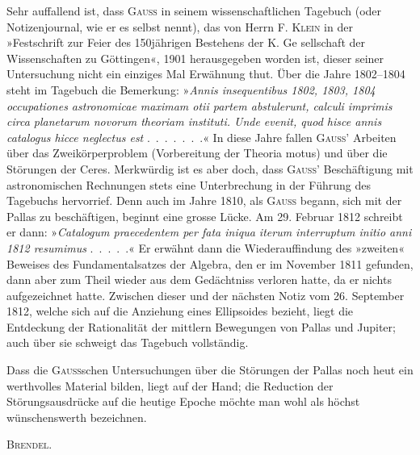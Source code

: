 \par\noindent\hspace*{\parindent}Sehr auffallend ist, dass \textsc{Gauss} in seinem wissenschaftlichen
Tagebuch (oder Notizenjournal, wie er es selbst nennt), das von Herrn
F. \textsc{Klein} in der »Festschrift zur Feier des 150jährigen Bestehens der K. Ge%
sellschaft der Wissenschaften zu Göttingen«, 1901 herausgegeben
worden ist, dieser seiner Untersuchung nicht ein einziges Mal Erwähnung thut.
Über die Jahre 1802--1804 steht im Tagebuch die Bemerkung: »\textit{Annis
insequentibus 1802, 1803, 1804 occupationes astronomicae maximam otii partem
abstulerunt, calculi imprimis circa planetarum novorum theoriam instituti.
Unde evenit, quod hisce annis catalogus hicce neglectus est} \mbox{.\ .\ .\ .\ .\ .\ .}«
In diese Jahre fallen \textsc{Gauss}' Arbeiten über das Zweikörperproblem
(Vorbereitung der Theoria motus) und über die Störungen der Ceres. Merkwürdig
ist es aber doch, dass \textsc{Gauss}' Beschäftigung mit astronomischen Rechnungen
stets eine Unterbrechung in der Führung des Tagebuchs hervorrief. Denn auch
im Jahre 1810, als \textsc{Gauss} begann, sich mit der Pallas zu beschäftigen,
beginnt eine grosse Lücke. Am 29. Februar 1812 schreibt er dann: »\textit{Catalogum
praecedentem per fata iniqua iterum interruptum initio anni 1812 resumimus}
\mbox{.\ .\ .\ .\ .}« Er erwähnt dann die Wiederauffindung des »zweiten« Beweises
des Fundamentalsatzes der Algebra, den er im November 1811 gefunden, dann
aber zum Theil wieder aus dem Gedächtniss verloren hatte, da er nichts
aufgezeichnet hatte. Zwischen dieser und der nächsten Notiz vom 26. September
1812, welche sich auf die Anziehung eines Ellipsoides bezieht, liegt die
Entdeckung der Rationalität der mittlern Bewegungen von Pallas und Jupiter;
auch über sie schweigt das Tagebuch vollständig.

\par\noindent\hspace*{\parindent}Dass die \textsc{Gauss}schen Untersuchungen über die Störungen der Pallas
noch heut ein werthvolles Material bilden, liegt auf der Hand; die Reduction
der Störungsausdrücke auf die heutige Epoche möchte man wohl als höchst
wünschenswerth bezeichnen.
\par\nobreak\noindent\hfill\textsc{Brendel}.\par
\nobreak\vspace{3pt}\noindent\makebox[\linewidth]{\rule{.24\linewidth}{.4pt}}\par
\clearpage
\endgroup
